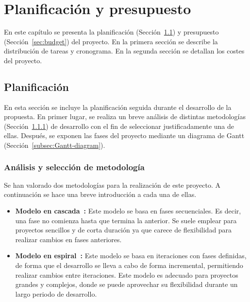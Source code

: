 \chapter{Planificación y presupuesto}\label{chap:planning}
En este capítulo se presenta la planificación (Sección~\ref{sec:planning}) y presupuesto (Sección~\ref{sec:budget}) del proyecto. En la primera sección se describe la distribución de tareas y cronograma. En la segunda sección se detallan los costes del proyecto.

\section{Planificación}\label{sec:planning}
En esta sección se incluye la planificación seguida durante el desarrollo de la propuesta. En primer lugar, se realiza un breve análisis de distintas metodologías (Sección~\ref{subsec:metodology}) de desarrollo con el fin de seleccionar justificadamente una de ellas. Después, se exponen las fases del proyecto mediante un diagrama de Gantt (Sección~\ref{subsec:Gantt-diagram}).

\subsection{Análisis y selección de metodología}\label{subsec:metodology}
Se han valorado dos metodologías para la realización de este proyecto. A continuación se hace una breve introducción a cada una de ellas.

\begin{itemize}
    \item \textbf{Modelo en cascada~\cite{cascade}:} Este modelo se basa en fases secuenciales. Es decir, una fase no comienza hasta que termina la anterior. Se suele emplear para proyectos sencillos y de corta duración ya que carece de flexibilidad para realizar cambios en fases anteriores.
    \item \textbf{Modelo en espiral~\cite{spiral}:} Este modelo se basa en iteraciones con fases definidas, de forma que el desarrollo se lleva a cabo de forma incremental, permitiendo realizar cambios entre iteraciones. Este modelo es adecuado para proyectos grandes y complejos, donde se puede aprovechar su flexibilidad durante un largo periodo de desarrollo.
\end{itemize}

